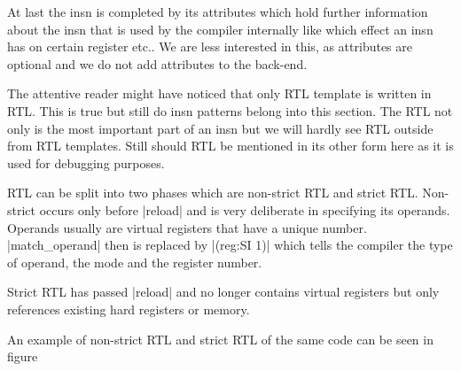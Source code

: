 At last the insn is completed by its attributes which hold further information about the insn that is used by the compiler internally like which effect an insn has on certain register etc..
We are less interested in this, as attributes are optional and we do not add attributes to the back-end. \cite{GCCint:attributes}


The attentive reader might have noticed that only RTL template is written in RTL.
This is true but still do insn patterns belong into this section.
The RTL not only is the most important part of an insn but we will hardly see RTL outside from RTL templates.
Still should RTL be mentioned in its other form here as it is used for debugging purposes.

RTL can be split into two phases which are non-strict RTL and strict RTL.
Non-strict occurs only before |reload| and is very deliberate in specifying its operands.
Operands usually are virtual registers that have a unique number.
|match_operand| then is replaced by |(reg:SI 1)| which tells the compiler the type of operand, the mode and the register number.\cite{GCCint:regsnmem}

Strict RTL has passed |reload| and no longer contains virtual registers but only references existing hard registers or memory.

An example of non-strict RTL and strict RTL of the same code can be seen in figure 


